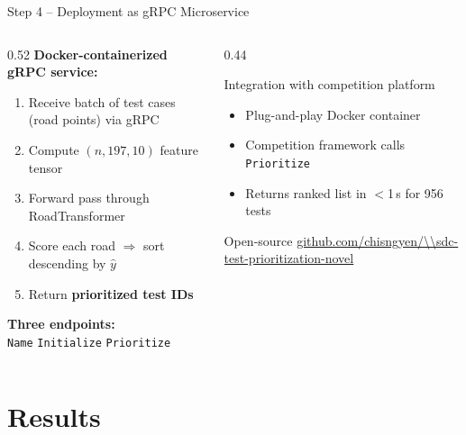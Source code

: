 \documentclass[aspectratio=169,10pt]{beamer}
\begin{document}
\begin{frame}{Step 4 -- Deployment as gRPC Microservice}
  \begin{columns}[T]
    \begin{column}{0.52\linewidth}
      \textbf{Docker-containerized gRPC service:}
      \vspace{4pt}
      \begin{enumerate}
        \item Receive batch of test cases (road points) via gRPC
        \item Compute $(n, 197, 10)$ feature tensor
        \item Forward pass through RoadTransformer
        \item Score each road $\Rightarrow$ sort descending by $\hat{y}$
        \item Return \textbf{prioritized test IDs}
      \end{enumerate}
      \vspace{8pt}
      \textbf{Three endpoints:}\\
      \texttt{Name} \quad \texttt{Initialize} \quad \texttt{Prioritize}
    \end{column}
    \begin{column}{0.44\linewidth}
      \begin{block}{Integration with competition platform}
        \begin{itemize}
          \item Plug-and-play Docker container
          \item Competition framework calls \texttt{Prioritize}
          \item Returns ranked list in $<$1\,s for 956 tests
        \end{itemize}
      \end{block}
      \vspace{6pt}
      \begin{alertblock}{Open-source}
        \url{github.com/chisngyen/\\sdc-test-prioritization-novel}
      \end{alertblock}
    \end{column}
  \end{columns}
\end{frame}

\section{Results}
\end{document}
